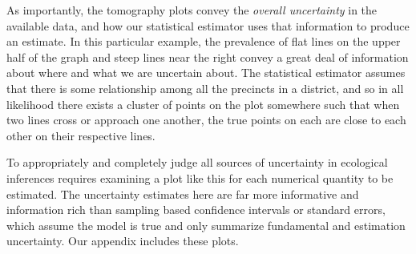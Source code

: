 \documentclass[12pt]{article}
\begin{document}
As importantly, the tomography plots convey the \emph{overall
  uncertainty} in the available data, and how our statistical
estimator uses that information to produce an estimate.  In this
particular example, the prevalence of flat lines on the upper half of the graph and
steep lines near the right convey a great deal of information about
where and what we are uncertain about.  The statistical estimator
assumes that there is some relationship among all the precincts in a
district, and so in all likelihood there exists a cluster of points on
the plot somewhere such that when two lines cross or approach one
another, the true points on each are close to each other on their
respective lines.  

To appropriately and completely judge all sources of uncertainty in
ecological inferences requires examining a plot like this for each
numerical quantity to be estimated.  The uncertainty estimates here
are far more informative and information rich than sampling based
confidence intervals or standard errors, which assume the model is
true and only summarize fundamental and estimation uncertainty.  Our
appendix includes these plots.



\singlespace
 
\bibsep=0in 
{}

\end{document}
